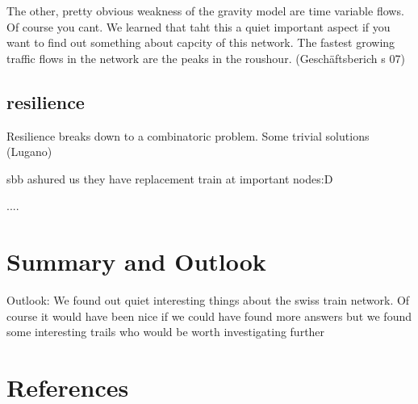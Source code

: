 \documentclass[11pt]{article}
\begin{document}
The other, pretty obvious weakness of the gravity model are time variable flows. Of course you cant. We learned that taht this a quiet important aspect  if you want to find out something about capcity of this network. The fastest growing traffic flows in the network are the peaks in the roushour. (Geschäftsberich s 07)



\subsection{resilience}
 Resilience breaks down to a combinatoric problem. Some trivial solutions (Lugano)
 
 sbb ashured us they have replacement train at important nodes:D

....



\section{Summary and Outlook}

Outlook:
We found out quiet interesting things about the swiss train network. Of course it would have been nice if we could have found more answers but we found some interesting trails who would be worth investigating further

\section{References}
\end{document}
